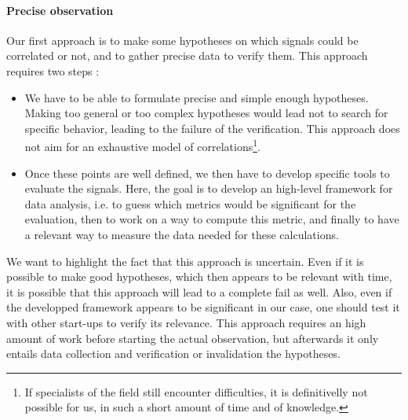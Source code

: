 \documentclass[twoside]{report}
\begin{document}
	\paragraph{Precise observation}Our first approach is to make some hypotheses on which signals could be correlated or not, and to gather precise data to verify them. This approach requires two steps : 
	\begin{itemize}
		\item We have to be able to formulate precise and simple enough hypotheses. Making too general or too complex hypotheses would lead not to search for specific behavior, leading to the failure of the verification. This approach does not aim for an exhaustive model of correlations\footnote{If specialists of the field still encounter difficulties, it is definitivelly not possible for us, in such a short amount of time and of knowledge.}.
		\item Once these points are well defined, we then have to develop specific tools to evaluate the signals. Here, the goal is to develop an high-level framework for data analysis, i.e. to guess which metrics would be significant for the evaluation, then to work on a way to compute this metric, and finally to have a relevant way to measure the data needed for these calculations.
	\end{itemize}
	We want to highlight the fact that this approach is uncertain. Even if it is possible to make good hypotheses, which then appears to be relevant with time, it is possible that this approach will lead to a complete fail as well. Also, even if the developped framework appears to be significant in our case, one should test it with other start-ups to verify its relevance. This approach requires an high amount of work before starting the actual observation, but afterwards it only entails data collection and verification or invalidation the hypotheses.
\end{document}
